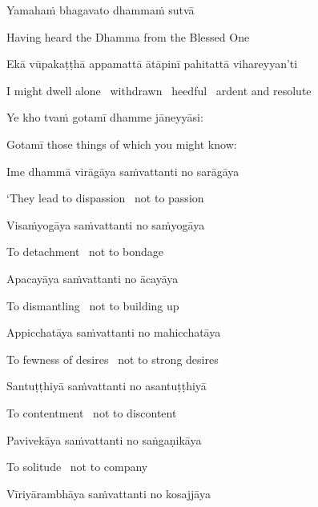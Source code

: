 Yamahaṁ bhagavato dhammaṁ sutvā

\begin{english}
  Having heard the Dhamma from the Blessed One
\end{english}

Ekā vūpakaṭṭhā appamattā ātāpinī pahitattā vihareyyan’ti

\begin{english}
  I might dwell alone \breathmark\ withdrawn \breathmark\ heedful \breathmark\ ardent and resolute
\end{english}

Ye kho tvaṁ gotamī dhamme jāneyyāsi:

\begin{english}
  Gotamī those things of which you might know:
\end{english}

Ime dhammā virāgāya saṁvattanti no sarāgāya

\begin{english}
  ‘They lead to dispassion \breathmark\ not to passion
\end{english}

Visaṁyogāya saṁvattanti no saṁyogāya

\begin{english}
  To detachment \breathmark\ not to bondage
\end{english}

Apacayāya saṁvattanti no ācayāya

\begin{english}
  To dismantling \breathmark\ not to building up
\end{english}

Appicchatāya saṁvattanti no mahicchatāya

\begin{english}
  To fewness of desires \breathmark\ not to strong desires
\end{english}

Santuṭṭhiyā saṁvattanti no asantuṭṭhiyā

\begin{english}
  To contentment \breathmark\ not to discontent
\end{english}

Pavivekāya saṁvattanti no saṅgaṇikāya

\begin{english}
  To solitude \breathmark\ not to company
\end{english}

Vīriyārambhāya saṁvattanti no kosajjāya

